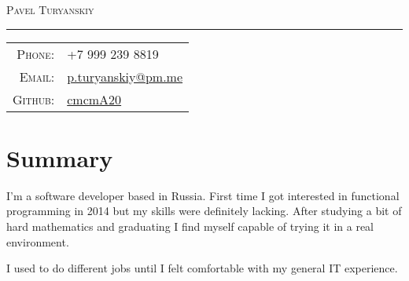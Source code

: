 \documentclass[a4paper,11pt]{article}
\begin{document}
  \begin{center}
    \Huge \textsc{Pavel Turyanskiy}
  \end{center}

  \hrule
  \vspace{0.5em}

  \begin{tabular}{rl}
    \textsc{Phone:}  & +7 999 239 8819                                      \\
    \textsc{Email:}  & \href{mailto:p.turyanskiy@pm.me}{p.turyanskiy@pm.me} \\
    \textsc{Github:} & \href{https://github.com/cmcmA20}{cmcmA20}           \\
  \end{tabular}

  \section{Summary}
    I'm a software developer based in Russia. First time I got interested in functional programming in 2014 but
    my skills were definitely lacking. After studying a bit of hard mathematics and graduating I find myself capable of
    trying it in a real environment.

    I used to do different jobs until I felt comfortable with my general IT experience.
\end{document}
